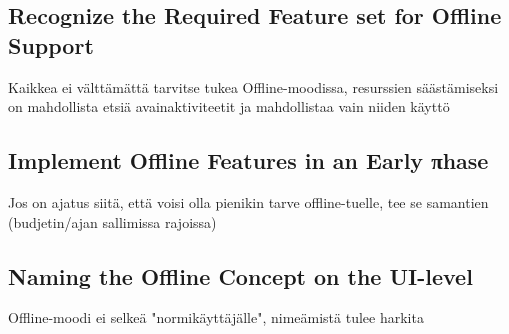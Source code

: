 \subsection{Recognize the Required Feature set for Offline Support}
Kaikkea ei välttämättä tarvitse tukea Offline-moodissa, resurssien säästämiseksi on mahdollista etsiä avainaktiviteetit ja mahdollistaa vain niiden käyttö


\subsection{Implement Offline Features in an Early πhase}
Jos on ajatus siitä, että voisi olla pienikin tarve offline-tuelle, tee se samantien (budjetin/ajan sallimissa rajoissa)

\subsection{Naming the Offline Concept on the UI-level}
Offline-moodi ei selkeä "normikäyttäjälle", nimeämistä tulee harkita










